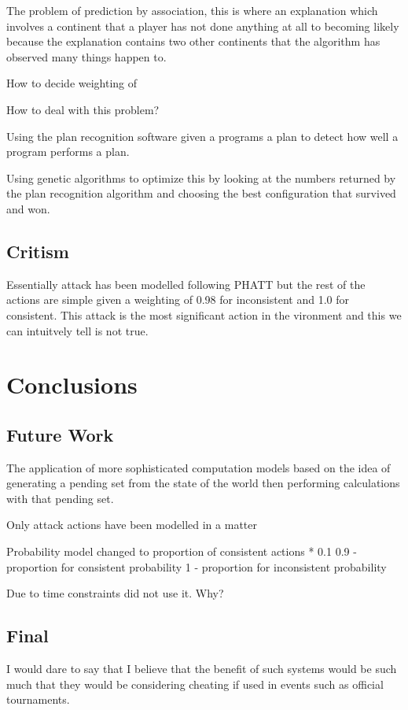 \documentclass[parskip]{cs4rep}
\begin{document}
The problem of prediction by association, this is where an explanation which involves a continent that a player has not done anything at all to becoming likely because the explanation contains two other continents that the algorithm has observed many things happen to.

How to decide weighting of 

How to deal with this problem?

Using the plan recognition software given a programs a plan to detect how well a program performs a plan. 

Using genetic algorithms to optimize this by looking at the numbers returned by the plan recognition algorithm and choosing the best configuration that survived and won.

\section{Critism}

Essentially attack has been modelled following PHATT but the rest of the actions are simple given a weighting of 0.98 for inconsistent and 1.0 for consistent. This attack is the most significant action in the vironment and this we can intuitvely tell is not true.

\chapter{Conclusions}

\section{Future Work}

The application of more sophisticated computation models based on the idea of generating a pending set from the state of the world then performing calculations with that pending set.

Only attack actions have been modelled in a matter 

Probability model changed to proportion of consistent actions * 0.1 
0.9 - proportion for consistent probability
1 - proportion for inconsistent probability

Due to time constraints did not use it. Why?

\section{Final}

I would dare to say that I believe that the benefit of such systems would be such much that they would be considering cheating if used in events such as official tournaments.
\end{document}
